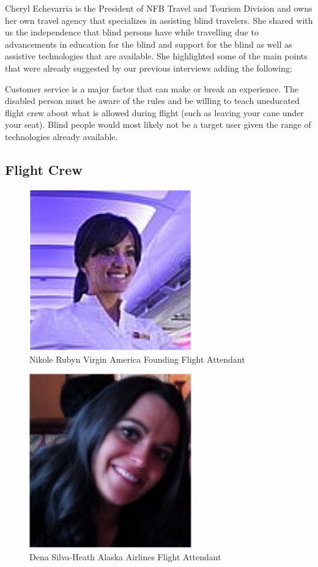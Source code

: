 Cheryl Echevarria is the President of NFB Travel and Tourism Division and owns her own travel agency that specializes in assisting blind travelers.  She shared with us the independence that blind persons have while travelling due to advancements in education for the blind and support for the blind as well as assistive technologies that are available.  She highlighted some of the main points that were already suggested by our previous interviews adding the following:

\begin{list}{-}{}
  \item Customer service is a major factor that can make or break an experience. The disabled person must be aware of the rules and be willing to teach uneducated flight crew about what is allowed during flight (such as leaving your cane under your seat). Blind people would most likely not be a target user given the range of technologies already available.
\end{list}

\subsection{Flight Crew}

\begin{figure}[h]
  \centering
     \includegraphics[width=7cm]{images/image029}
   \caption{Nikole Rubyn Virgin America Founding Flight Attendant}
  \label{fig:29}
\end{figure}

\begin{figure}[h]
  \centering
     \includegraphics[width=7cm]{images/image030}
   \caption{Dena Silva-Heath Alaska Airlines Flight Attendant}
  \label{fig:30}
\end{figure}

